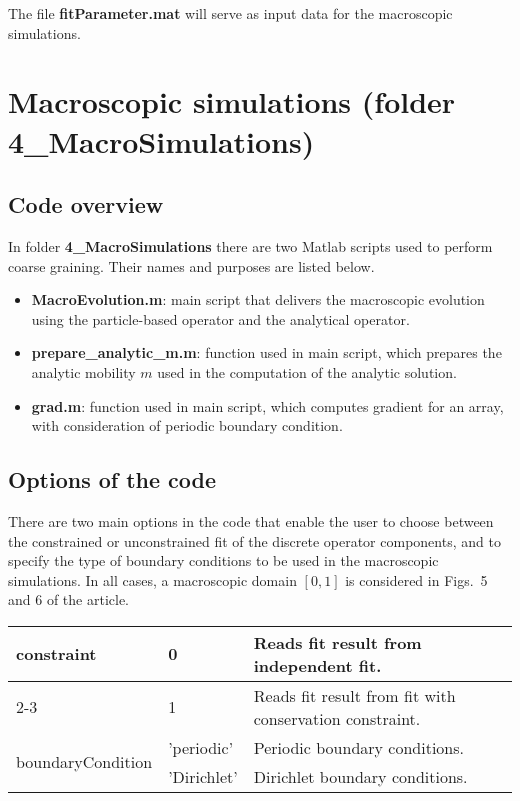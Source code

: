 \documentclass[authoryear,3p,11pt]{elsarticle}
\begin{document}
The file {\bf fitParameter.mat} will serve as input data for the macroscopic simulations.

\section{Macroscopic simulations (folder 4\_MacroSimulations)}  \label{Sec:MacroSimulations}
\subsection{Code overview} 
In folder {\bf 4\_MacroSimulations} there are two Matlab scripts used to perform coarse graining. Their names and purposes are listed below.

\begin{itemize}
\item {\bf MacroEvolution.m}: main script that delivers the macroscopic evolution using the particle-based operator and the analytical operator.
\item {\bf prepare\_analytic\_m.m}: function used in main script, which prepares the analytic mobility $m$ used in the computation of the analytic solution.
\item {\bf grad.m}: function used in main script, which computes gradient for an array, with consideration of periodic boundary condition.
\end{itemize}

\subsection{Options of the code} 
There are two main options in the code that enable the user to choose between the constrained or unconstrained fit of the discrete operator components, and to specify the type of boundary conditions to be used in the macroscopic simulations. In all cases, a macroscopic domain $[0,1]$ is considered in Figs.~5 and 6 of the article.

\begin{center}
\begin{tabular}{ |l|l|p{90mm}| }
\hline
\multirow{3}{*}{constraint} &  0 & Reads fit result from independent fit.\\ 
\cline{2-3}
& 1 &  Reads fit result from fit with conservation constraint.\\  
\hline
\multirow{3}{*}{boundaryCondition} &  'periodic' & Periodic boundary conditions.\\ 
\cline{2-3}
& 'Dirichlet' & Dirichlet boundary conditions.\\  
\hline
\end{tabular}
\end{center}
\end{document}
